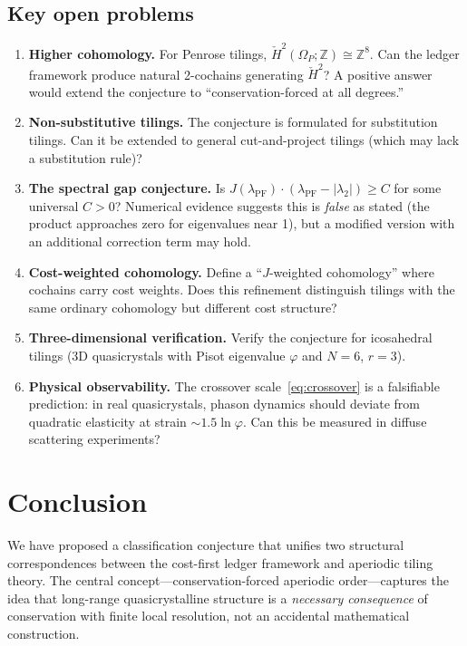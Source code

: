 \documentclass[12pt]{article}
\theoremstyle{definition}
\theoremstyle{remark}
\newcommand{\ZZ}{\mathbb{Z}}
\newcommand{\Hcech}{\check{H}}
\DeclareMathOperator{\PF}{PF}
\begin{document}
\subsection{Key open problems}

\begin{enumerate}
\item \textbf{Higher cohomology.} For Penrose tilings, $\Hcech^2(\Omega_P; \ZZ) \cong \ZZ^8$. Can the ledger framework produce natural 2-cochains generating $\Hcech^2$? A positive answer would extend the conjecture to ``conservation-forced at all degrees.''

\item \textbf{Non-substitutive tilings.} The conjecture is formulated for substitution tilings. Can it be extended to general cut-and-project tilings (which may lack a substitution rule)?

\item \textbf{The spectral gap conjecture.} Is $J(\lambda_\PF) \cdot (\lambda_\PF - |\lambda_2|) \geq C$ for some universal $C > 0$? Numerical evidence suggests this is \emph{false} as stated (the product approaches zero for eigenvalues near 1), but a modified version with an additional correction term may hold.

\item \textbf{Cost-weighted cohomology.} Define a ``$J$-weighted cohomology'' where cochains carry cost weights. Does this refinement distinguish tilings with the same ordinary cohomology but different cost structure?

\item \textbf{Three-dimensional verification.} Verify the conjecture for icosahedral tilings (3D quasicrystals with Pisot eigenvalue $\varphi$ and $N = 6$, $r = 3$).

\item \textbf{Physical observability.} The crossover scale~\eqref{eq:crossover} is a falsifiable prediction: in real quasicrystals, phason dynamics should deviate from quadratic elasticity at strain $\sim 1.5 \ln \varphi$. Can this be measured in diffuse scattering experiments?
\end{enumerate}


\section{Conclusion}

We have proposed a classification conjecture that unifies two structural correspondences between the cost-first ledger framework and aperiodic tiling theory. The central concept---conservation-forced aperiodic order---captures the idea that long-range quasicrystalline structure is a \emph{necessary consequence} of conservation with finite local resolution, not an accidental mathematical construction.
\end{document}
